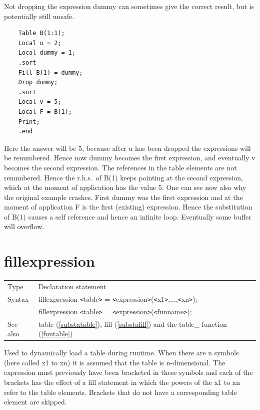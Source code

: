 \noindent Not dropping the expression dummy can sometimes give the correct 
result, but is potentially still unsafe. 
\begin{verbatim}
    Table B(1:1);
    Local u = 2;
    Local dummy = 1;
    .sort
    Fill B(1) = dummy;
    Drop dummy;
    .sort
    Local v = 5;
    Local F = B(1);
    Print;
    .end
\end{verbatim}
Here the answer will be 5, because after u has been dropped the expressions 
will be renumbered. Hence now dummy becomes the first expression, and 
eventually v becomes the second expression. The references in the table 
elements are not renumbered. Hence the r.h.s.\ of B(1) keeps pointing at the 
second expression, which at the moment of application has the value 5. One 
can see now also why the original example crashes. First dummy was the 
first expression and at the moment of application F is the first (existing) 
expression. Hence the substitution of B(1) causes a self reference and 
hence an infinite loop. Eventually some buffer will 
overflow.
\vspace{10mm}

 
\section{fillexpression}
\label{substafillexpression}

\noindent \begin{tabular}{ll}
Type & Declaration statement\\
Syntax & fillexpression {\tt<}table{\tt>} = {\tt<}expression{\tt>}({\tt<}x1{\tt>},...,{\tt<}xn{\tt>});
\\     & fillexpression {\tt<}table{\tt>} = {\tt<}expression{\tt>}({\tt<}funname{\tt>});
\\ See also & table (\ref{substatable}), 
                fill (\ref{substafill}) and the table\_ function 
(\ref{funtable})
\end{tabular}\vspace{4mm}

\noindent Used to dynamically
load a table during runtime. When 
there are n symbols (here called x1 to xn) it is assumed that the table is 
n-dimensional. The expression must previously have been bracketed in these 
symbols and each of the brackets has the effect of a 
fill statement in which the powers of the x1 to xn refer to the 
table elements. Brackets that do not have a corresponding table element are 
skipped.

